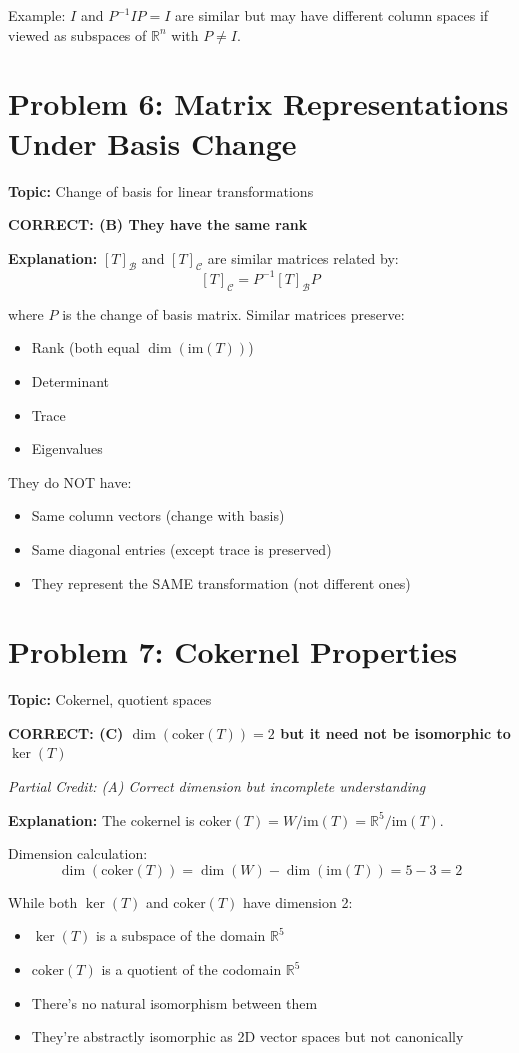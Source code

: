 \documentclass[12pt]{amsart}
\newcommand{\correct}[1]{{\color{blue}\textbf{CORRECT: #1}}}
\newcommand{\partcred}[1]{{\color{red}\textit{Partial Credit: #1}}}
\begin{document}
Example: $I$ and $P^{-1}IP = I$ are similar but may have different column spaces if viewed as subspaces of $\mathbb{R}^n$ with $P \neq I$.

\hrulefill

\section*{Problem 6: Matrix Representations Under Basis Change}
\textbf{Topic:} Change of basis for linear transformations

\correct{(B) They have the same rank}

\textbf{Explanation:} 
$[T]_{\mathcal{B}}$ and $[T]_{\mathcal{C}}$ are similar matrices related by:
$$[T]_{\mathcal{C}} = P^{-1}[T]_{\mathcal{B}}P$$

where $P$ is the change of basis matrix. Similar matrices preserve:
\begin{itemize}
\item Rank (both equal $\dim(\text{im}(T))$)
\item Determinant
\item Trace
\item Eigenvalues
\end{itemize}

They do NOT have:
\begin{itemize}
\item Same column vectors (change with basis)
\item Same diagonal entries (except trace is preserved)
\item They represent the SAME transformation (not different ones)
\end{itemize}

\hrulefill

\section*{Problem 7: Cokernel Properties}
\textbf{Topic:} Cokernel, quotient spaces

\correct{(C) $\dim(\text{coker}(T)) = 2$ but it need not be isomorphic to $\ker(T)$}

\partcred{(A) Correct dimension but incomplete understanding}

\textbf{Explanation:} 
The cokernel is $\text{coker}(T) = W/\text{im}(T) = \mathbb{R}^5/\text{im}(T)$.

Dimension calculation:
$$\dim(\text{coker}(T)) = \dim(W) - \dim(\text{im}(T)) = 5 - 3 = 2$$

While both $\ker(T)$ and $\text{coker}(T)$ have dimension 2:
\begin{itemize}
\item $\ker(T)$ is a subspace of the domain $\mathbb{R}^5$
\item $\text{coker}(T)$ is a quotient of the codomain $\mathbb{R}^5$
\item There's no natural isomorphism between them
\item They're abstractly isomorphic as 2D vector spaces but not canonically
\end{itemize}
\end{document}
